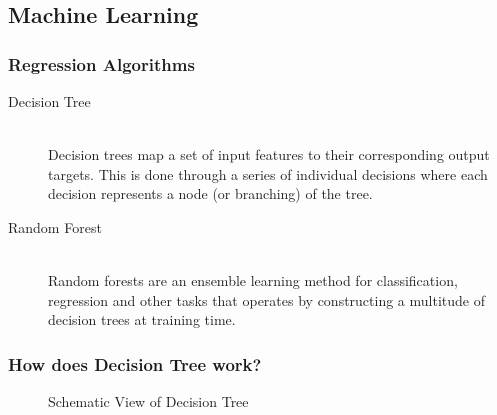 \documentclass{beamer}
\begin{document}
\subsection{Machine Learning}
\begin{frame}
	\frametitle{Regression Algorithms}
    \begin{description}
        \item[Decision Tree] \hfill \\ Decision trees map a set of input features to their corresponding output targets. This is done through a series of individual decisions where each decision represents a node (or branching) of the tree. 
        \\[0.2in]
        \pause
        \item[Random Forest] \hfill \\ Random forests are an ensemble learning method for classification, regression and other tasks that operates by constructing a multitude of decision trees at training time. 
    \end{description}
    \end{frame}
\begin{frame}
	\frametitle{How does Decision Tree work?}
    \begin{figure}
        \caption*{Schematic View of Decision Tree}
    \end{figure}
    \end{frame}
\end{document}
